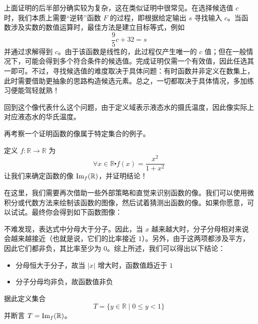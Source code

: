 上面证明的后半部分确实较为复杂，这在类似证明中很常见。在选择候选值 $c$ 时，我们本质上需要``逆转''函数 $F$ 的过程，即根据给定输出 $s$ 寻找输入 $c$。当函数涉及实数的数值运算时，最佳方法是建立目标等式，例如
\[\frac{9}{5}c + 32 = s\]
并通过求解得到 $c$。由于该函数是线性的，此过程仅产生唯一的 $c$ 值；但在一般情况下，可能会得到多个符合条件的候选值。完成证明仅需一个有效值，因此任选其一即可。不过，寻找候选值的难度取决于具体问题：有时函数并非定义在数集上，此时需要借助更抽象的思路构造候选元素。总之，一切都取决于具体情况，多加练习便能驾轻就熟！

回到这个像代表什么这个问题，由于定义域表示液态水的摄氏温度，因此像实际上对应液态水的华氏温度。

再考察一个证明函数的像属于特定集合的例子。\\

\begin{example}
    定义 $f : \mathbb{R} \to \mathbb{R}$ 为
    \[\forall x \in \mathbb{R} \centerdot f(x) = \frac{x^2}{1+x^2}\]
    让我们来确定函数的像 $\text{Im}_f (\mathbb{R})$，并证明结论！

    在这里，我们需要再次借助一些外部策略和直觉来识别函数的像。我们可以使用微积分或代数方法来绘制该函数的图像，然后试着猜测出函数的像。如果你愿意，可以试试。最终你会得到如下函数图像：

    \begin{center}
    \end{center}

    不难发现，表达式中分母大于分子。因此，当 $x$ 越来越大时，分子分母相对来说会越来越接近（也就是说，它们的比率接近 $1$）。另外，由于这两项都涉及平方，因此它们都非负，其比率至少为 $0$。综上所述，我们可以得出以下结论：
    \begin{itemize}
        \item 分母恒大于分子，故当 $|x|$ 增大时，函数值趋近于 $1$
        \item 分子分母均非负，故函数值非负
    \end{itemize}
    据此定义集合
    \[T = \{y \in \mathbb{R} \mid 0 \le y < 1\}\]
    并断言 $T = \text{Im}_f(\mathbb{R})$。


\end{example}
